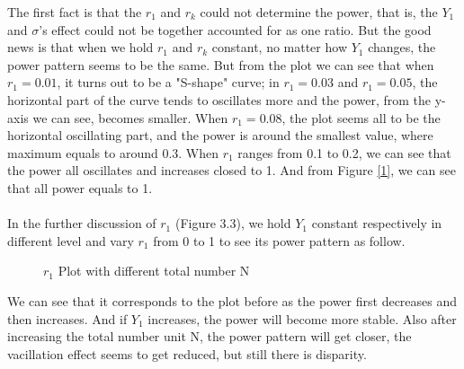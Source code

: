 \documentclass[10pt,english]{article}\usepackage{graphicx, color}
\numberwithin{equation}{section}
\numberwithin{figure}{section}
\begin{document}
The first fact is that the  $r_1$ and $r_k$ could not determine the power, that is, the $Y_1$ and $\sigma$'s effect could not be together accounted for as one ratio. But the good news is that when we hold $r_1$ and $r_k$ constant, no matter how $Y_1$ changes, the power pattern seems to be the same. But from the plot we can see that when $r_1=0.01$, it turns out to be a "S-shape" curve; in $r_1=0.03$ and $r_1=0.05$, the horizontal part of the curve tends to oscillates more and the power, from the y-axis we can see, becomes smaller. When $r_1=0.08$, the plot seems all to be the horizontal oscillating part, and the power is around the smallest value, where maximum equals to around 0.3. When $r_1$ ranges from 0.1 to 0.2, we can see that the power all oscillates and increases closed to 1. And from Figure \ref{1}, we can see that all power equals to 1.\\
\quad\\
In the further discussion of $r_1$ (Figure 3.3), we hold $Y_1$  constant respectively in different level and vary $r_1$ from 0 to 1 to see its power pattern as follow.\\
\begin{figure}[htbp]
\centering{}
\caption{$r_1$ Plot with different total number N}
\end{figure}
\quad
We can see that it corresponds to the plot before as the power first decreases and then increases. And if $Y_1$ increases, the power will become more stable. Also after increasing the total number unit N, the power pattern will get closer, the vacillation effect seems to get reduced, but still there is disparity. 
\end{document}
